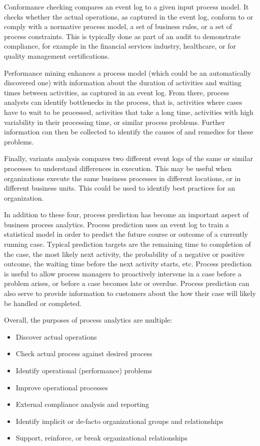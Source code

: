 Conformance checking compares an event log to a given input process model. It checks whether the actual operations, as captured in the event log, conform to or comply with a normative process model, a set of business rules, or a set of process constraints. This is typically done as part of an audit to demonstrate compliance, for example in the financial services industry, healthcare, or for quality management certifications. 

Performance mining enhances a process model (which could be an automatically discovered one) with information about the duration of activities and waiting times between activities, as captured in an event log. From there, process analysts can identify bottlenecks in the process, that is, activities where cases have to wait to be processed, activities that take a long time, activities with high variability in their processing time, or similar process problems. Further information can then be collected to identify the causes of and remedies for these problems.

Finally, variants analysis compares two different event logs of the same or similar processes to understand differences in execution. This may be useful when organizations execute the same business processes in different locations, or in different business units. This could be used to identify best practices for an organization.

In addition to these four, process prediction has become an important aspect of business process analytics. Process prediction uses an event log to train a statistical model in order to predict the future course or outcome of a currently running case. Typical prediction targets are the remaining time to completion of the case, the most likely next activity, the probability of a negative or positive outcome, the waiting time before the next activity starts, etc. Process prediction is useful to allow process managers to proactively intervene in a case before a problem arises, or before a case becomes late or overdue. Process prediction can also serve to provide information to customers about the how their case will likely be handled or completed.

Overall, the purposes of process analytics are multiple:
\begin{itemize}
   \item Discover actual operations
   \item Check actual process against desired process
   \item Identify operational (performance) problems
   \item Improve operational processes
   \item External compliance analysis and reporting
   \item Identify implicit or de-facto organizational groups and relationships 
   \item Support, reinforce, or break organizational relationships
\end{itemize}

